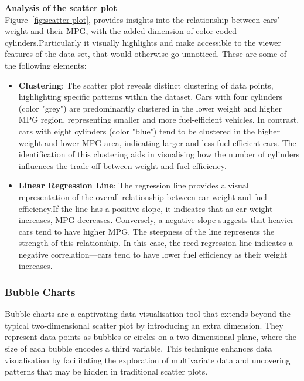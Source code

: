\documentclass{article}\usepackage[]{graphicx}\usepackage[]{xcolor}
\newenvironment{knitrout}{}{} %
\begin{document}
\begin{knitrout}
\end{knitrout}

\textbf{Analysis of the scatter plot}\\
Figure~\ref{fig:scatter-plot}, provides insights into the relationship between cars' weight and their MPG, with the added dimension of color-coded cylinders.Particularly it visually highlights and make accessible to the viewer features of the data set, that would otherwise go unnoticed. These are some of the following elements: 
\begin{itemize}
    \item \textbf{Clustering}: The scatter plot reveals distinct clustering of data points, highlighting specific patterns within the dataset. Cars with four cylinders (color "grey") are predominantly clustered in the lower weight and higher MPG region, representing smaller and more fuel-efficient vehicles. In contrast, cars with eight cylinders (color "blue") tend to be clustered in the higher weight and lower MPG area, indicating larger and less fuel-efficient cars. The identification of this clustering aids in visualising how the number of cylinders influences the trade-off between weight and fuel efficiency.\\
    \item \textbf{Linear Regression Line}: The regression line provides a visual representation of the overall relationship between car weight and fuel efficiency.If the line has a positive slope, it indicates that as car weight increases, MPG decreases. Conversely, a negative slope suggests that heavier cars tend to have higher MPG. The steepness of the line represents the strength of this relationship. In this case, the reed regression line indicates a negative correlation—cars tend to have lower fuel efficiency as their weight increases.
\end{itemize}

\subsubsection{Bubble Charts}
Bubble charts are a captivating data visualisation tool that extends beyond the typical two-dimensional scatter plot by introducing an extra dimension. They represent data points as bubbles or circles on a two-dimensional plane, where the size of each bubble encodes a third variable. This technique enhances data visualisation by facilitating the exploration of multivariate data and uncovering patterns that may be hidden in traditional scatter plots.\\
\end{document}
